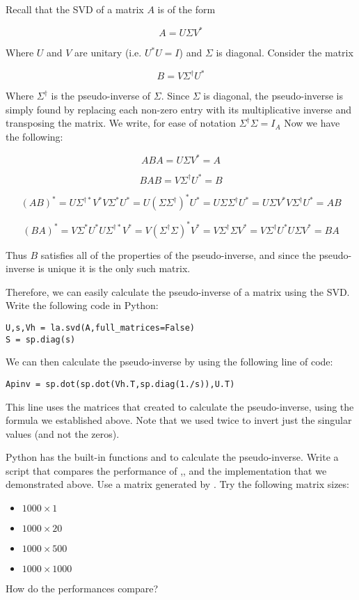 Recall that the SVD of a matrix $A$ is of the form

\[
A = U \Sigma V^*
\]

Where $U$ and $V$ are unitary (i.e. $U^*U = I$) and $\Sigma$ is diagonal. Consider the matrix

\[
B = V \Sigma^\dagger U^*
\]

Where $\Sigma^\dagger$ is the pseudo-inverse of $\Sigma$. Since $\Sigma$ is diagonal, the pseudo-inverse is simply found by replacing each non-zero entry with its multiplicative inverse and transposing the matrix. We write, for ease of notation $\Sigma^\dagger \Sigma = I_A$ Now we have the following:

\[
ABA = U \Sigma V^* = A
\]

\[
BAB = V \Sigma^\dagger U^* = B
\]

\[
(AB)^* = U \Sigma^{\dagger *} V^* V \Sigma^* U^* = U (\Sigma \Sigma^\dagger)^* U^* = U \Sigma \Sigma^\dagger U^* = U \Sigma V^* V \Sigma^\dagger U^* = AB
\]

\[
(BA)^* =  V \Sigma^* U^* U \Sigma^{\dagger *} V^* = V (\Sigma^\dagger \Sigma)^* V^* = V  \Sigma^\dagger \Sigma V^* =  V \Sigma^\dagger U^* U \Sigma V^* = BA
\]

Thus $B$ satisfies all of the properties of the pseudo-inverse, and since the pseudo-inverse is unique it is the only such matrix.

Therefore, we can easily calculate the pseudo-inverse of a matrix using the SVD. Write the following code in Python:

\begin{lstlisting}[style=python]
U,s,Vh = la.svd(A,full_matrices=False)
S = sp.diag(s)
\end{lstlisting}
We can then calculate the pseudo-inverse by using the following line of code:

\begin{lstlisting}[style=python]
Apinv = sp.dot(sp.dot(Vh.T,sp.diag(1./s)),U.T)
\end{lstlisting}

This line uses the matrices that  created to calculate the pseudo-inverse, using the formula we established above. Note that we used  twice to invert just the singular values (and not the zeros). 
\begin{problem}
Python has the built-in functions  and  to calculate the pseudo-inverse. Write a script that compares the performance of ,, and the implementation that we demonstrated above. Use a matrix generated by  .
 Try the following matrix sizes:
\begin{itemize}
\item $1000 \times 1$
\item $1000 \times 20$
\item $1000 \times 500$
\item $1000 \times 1000$
\end{itemize}
How do the performances compare?
\end{problem}

